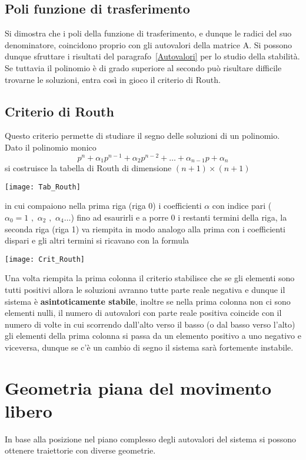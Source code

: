 \documentclass[a4paper]{article}
\begin{document}
	\subsection{Poli funzione di trasferimento}
	Si dimostra che i poli della funzione di trasferimento, e dunque le radici del suo denominatore, coincidono proprio con gli autovalori della matrice A. Si possono dunque sfruttare i risultati del paragrafo~\ref{Autovalori} per lo studio della stabilità. Se tuttavia il polinomio è di grado superiore al secondo può risultare difficile trovarne le soluzioni, entra così in gioco il criterio di Routh.	
	
	\subsection{Criterio di Routh}
	Questo criterio permette di studiare il segno delle soluzioni di un polinomio.\\Dato il polinomio monico \[p^n+\alpha_1p^{n-1}+\alpha_2p^{n-2}+\dots+\alpha_{n-1}p+\alpha_n\]
	si costruisce la tabella di Routh di dimensione $(n+1)\times (n+1)$
	\begin{center}
		\texttt{[image: Tab\_Routh]}
	\end{center}
	in cui compaiono nella prima riga (riga 0) i coefficienti $\alpha$ con indice pari ($\alpha_0=1\,\,,\,\,\alpha_2\,\,,\,\,\alpha_4\dots$) fino ad esaurirli e a porre 0 i restanti termini della riga, la seconda riga (riga 1) va riempita in modo analogo alla prima con i coefficienti dispari e gli altri termini si ricavano con la formula 
	\begin{center}
		\texttt{[image: Crit\_Routh]}
	\end{center}
	
	Una volta riempita la prima colonna il criterio stabilisce che se gli elementi sono tutti positivi allora le soluzioni avranno tutte parte reale negativa e dunque il sistema è \textbf{asintoticamente stabile}, inoltre se nella prima colonna non ci sono elementi nulli, il numero di autovalori con parte reale positiva coincide con il numero di volte in cui scorrendo dall'alto 
	verso il basso (o dal basso verso l'alto) gli elementi della prima colonna si passa da un elemento positivo a uno negativo e viceversa, dunque se c'è un cambio di segno il sistema sarà fortemente instabile.
	\section{Geometria piana del movimento libero}
	In base alla  posizione nel piano complesso degli autovalori del sistema si possono ottenere traiettorie con diverse geometrie.
	
\end{document}
